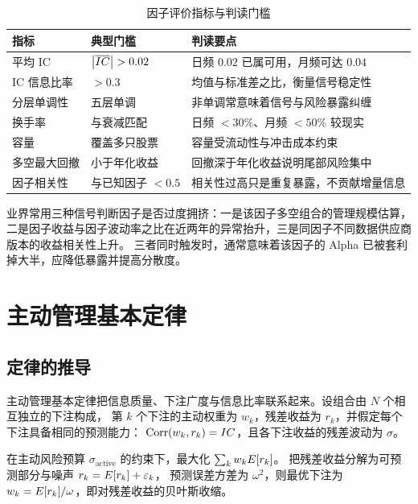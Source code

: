 \begin{table}[htbp]
\centering
\caption{因子评价指标与判读门槛}\label{tab:07-factormetrics}
\tablefont
\begin{tabular}{@{}llL{5.6cm}@{}}
\toprule
指标 & 典型门槛 & 判读要点 \\
\midrule
平均 IC & $\left\lvert \overline{IC} \right\rvert > 0.02$ & 日频 $0.02$ 已属可用，月频可达 $0.04$ \\
IC 信息比率 & $> 0.3$ & 均值与标准差之比，衡量信号稳定性 \\
分层单调性 & 五层单调 & 非单调常意味着信号与风险暴露纠缠 \\
换手率 & 与衰减匹配 & 日频 $< 30\%$、月频 $< 50\%$ 较现实 \\
容量 & 覆盖多只股票 & 容量受流动性与冲击成本约束 \\
多空最大回撤 & 小于年化收益 & 回撤深于年化收益说明尾部风险集中 \\
因子相关性 & 与已知因子 $< 0.5$ & 相关性过高只是重复暴露，不贡献增量信息 \\
\bottomrule
\end{tabular}
\end{table}

\begin{appbox}[因子拥挤度的三种度量]
业界常用三种信号判断因子是否过度拥挤：一是该因子多空组合的管理规模估算，
二是因子收益与因子波动率之比在近两年的异常抬升，三是同因子不同数据供应商版本的收益相关性上升。
三者同时触发时，通常意味着该因子的 Alpha 已被套利掉大半，应降低暴露并提高分散度。
\end{appbox}

\section{主动管理基本定律}

\subsection{定律的推导}

主动管理基本定律把信息质量、下注广度与信息比率联系起来。设组合由 $N$ 个相互独立的下注构成，
第 $k$ 个下注的主动权重为 $w_k$，残差收益为 $r_k$，并假定每个下注具备相同的预测能力：
$\operatorname{Corr}(w_k, r_k) = IC$，且各下注收益的残差波动为 $\sigma$。

在主动风险预算 $\sigma_{\text{active}}$ 的约束下，最大化 $\sum_k w_k E[r_k]$。
把残差收益分解为可预测部分与噪声 $r_k = E[r_k] + \varepsilon_k$，
预测误差方差为 $\omega^2$，则最优下注为 $w_k = E[r_k]/\omega$，即对残差收益的贝叶斯收缩。

